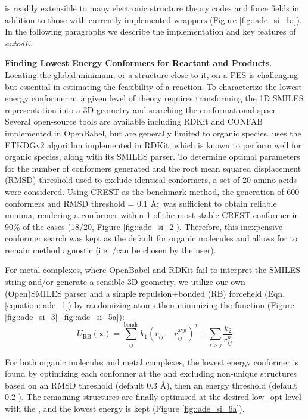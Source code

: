 \documentclass[../../main.tex]{subfiles}
\begin{document}
\ade is readily extensible to many electronic structure theory codes and force fields in addition to those with currently implemented wrappers (Figure \ref{fig::ade_si_1a}). In the following paragraphs we describe the implementation and key features of \emph{autodE}. 

{\bfseries{Finding Lowest Energy Conformers for Reactant and Products}}. Locating the global minimum, or a structure close to it, on a PES is challenging but essential in estimating the feasibility of a reaction.\cite{Chan2019} To characterize the lowest energy conformer at a given level of theory requires transforming the 1D SMILES representation into a 3D geometry and searching the conformational space. Several open-source tools are available including RDKit\cite{Landrum2019} and CONFAB\cite{OBoyle2011} implemented in OpenBabel, but are generally limited to organic species. \ade uses the ETKDGv2\cite{Riniker2015} algorithm implemented in RDKit, which is known to perform well for organic species, along with its SMILES parser.\cite{Ebejer2012} To determine optimal parameters for the number of conformers generated and the root mean squared displacement (RMSD) threshold used to exclude identical conformers, a set of 20 amino acids were considered. Using CREST\cite{Pracht2020} as the benchmark method, the generation of 600 conformers and RMSD threshold = 0.1 \AA$;$ was sufficient to obtain reliable minima, rendering a conformer within 1 \kcalx of the most stable CREST conformer in 90\% of the cases (18/20, Figure \ref{fig::ade_si_2}). Therefore, this inexpensive conformer search was kept as the default for organic molecules and allows for \ade to remain method agnostic (i.e. \lmethod/\hmethodx can be chosen by the user). 

For metal complexes, where OpenBabel and RDKit fail to interpret the SMILES string and/or generate a sensible 3D geometry, we utilize our own (Open)SMILES parser and a simple repulsion+bonded (RB) forcefield (Eqn. \eqref{equation::ade_1}) by randomizing atoms then minimizing the function (Figure \ref{fig::ade_si_3}--\ref{fig::ade_si_5a}):
\begin{equation}
	U_\text{RB}(\boldsymbol{x}) = \sum_{ij}^\text{bonds} k_1 (r_{ij} - r_{ij}^\text{avg})^2 + \sum_{i > j} \frac{k_2}{r_{ij}^n}
	\label{equation::ade_1}
\end{equation}

For both organic molecules and metal complexes, the lowest energy conformer is found by optimizing each conformer at the \lmethodx and excluding non-unique structures based on an RMSD threshold (default 0.3 \AA), then an energy threshold (default 0.2 \kcal). The remaining structures are finally optimised at the desired low\_opt level with the \hmethod, and the lowest energy is kept (Figure \ref{fig::ade_si_6a}).  
\end{document}
